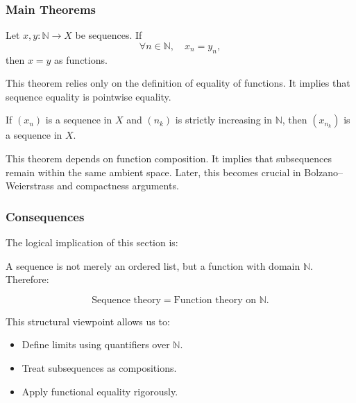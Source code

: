 \subsubsection{Main Theorems}

\begin{theorem}
Let $x,y : \mathbb{N}\to X$ be sequences.
If
\[
\forall n\in\mathbb{N},\quad x_n = y_n,
\]
then $x=y$ as functions.
\end{theorem}



\begin{remark}
This theorem relies only on the definition of equality of functions.
It implies that sequence equality is pointwise equality.
\end{remark}

\begin{theorem}
If $(x_n)$ is a sequence in $X$ and $(n_k)$ is strictly increasing in $\mathbb{N}$,
then $(x_{n_k})$ is a sequence in $X$.
\end{theorem}



\begin{remark}
This theorem depends on function composition.
It implies that subsequences remain within the same ambient space.
Later, this becomes crucial in Bolzano–Weierstrass and compactness arguments.
\end{remark}

\subsubsection{Consequences}

The logical implication of this section is:

A sequence is not merely an ordered list,
but a function with domain $\mathbb{N}$.
Therefore:

\[
\text{Sequence theory} 
=
\text{Function theory on } \mathbb{N}.
\]

This structural viewpoint allows us to:
\begin{itemize}
\item Define limits using quantifiers over $\mathbb{N}$.
\item Treat subsequences as compositions.
\item Apply functional equality rigorously.
\end{itemize}

